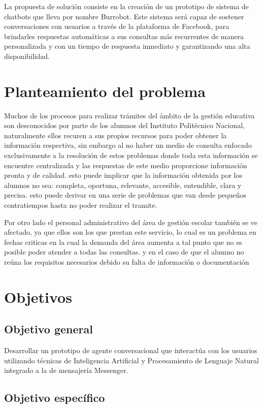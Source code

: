     La propuesta de solución consiste en la creación de un prototipo de sistema de chatbots que lleva por nombre Burrobot. Este sistema será capaz de sostener conversaciones con usuarios a través de la plataforma de Facebook, para brindarles respuestas automáticas a sus consultas más recurrentes de manera personalizada y con un tiempo de respuesta inmediato y garantizando una alta disponibilidad.
    \section{Planteamiento del problema}
    
    Muchos de los procesos para realizar trámites del ámbito de la gestión educativa son desconocidos por parte de los alumnos del Instituto Politécnico Nacional, naturalmente ellos recuren a sus propios recursos para poder obtener la información respectiva, sin embargo al no haber un medio de consulta enfocado exclusivamente a la resolución de estos problemas donde toda esta información se encuentre centralizada y las respuestas de este medio proporcione información pronta y de calidad. esto puede implicar que la información obtenida por los alumnos no sea: completa, oportuna, relevante, accesible, entendible, clara y precisa. esto puede derivar en una serie de problemas que van desde pequeños contratiempos hasta no poder realizar el tramite.
    
    Por otro lado el personal administrativo del área de gestión escolar también se ve afectado, ya que ellos son los que prestan este servicio, lo cual es un problema en fechas criticas en la cual la demanda del área aumenta a tal punto que no es posible poder atender a todas las consultas. y en el caso de que el alumno no reúna los requisitos necesarios debido su falta de información o documentación 
    \section{Objetivos}
    \subsection{Objetivo general}
    Desarrollar un prototipo de agente conversacional que interactúa con los usuarios utilizando técnicas de Inteligencia Artificial y Procesamiento de Lenguaje Natural integrado a la  de mensajería Messenger.

    \subsection{Objetivo específico}

